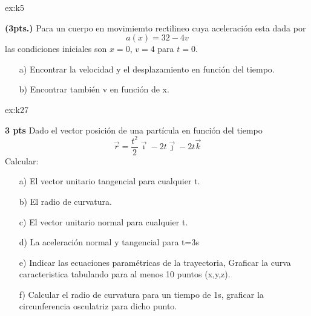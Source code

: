 \begin{multicols}{2}
    \begin{excercise}[][][a) $v(t) = \displaystyle{8-4e^{4-t}}$, $x(t)=\diplaystyle{8t+e^{-4t}}-1$; b) $x(v)=\displaystyle{-2\ln{(8-v)}-\frac{v}{4}+4\ln 2+1}$]{ex:k5}{
        \textbf{(3pts.)} 
        Para un cuerpo en movimiemto rectilineo cuya aceleración esta dada por 
         \begin{equation*}
             a(x)=32-4v
         \end{equation*}
         las condiciones iniciales son $x=0$,  $v=4$ para $t=0$.
         \begin{itemize}
             \item[a)] Encontrar la velocidad y el desplazamiento en función del tiempo.
             \item[b)] Encontrar también v en función de x.
         \end{itemize}
        }
    \end{excercise}
    \begin{excercise}[][][a) $\vec{e}_t=\frac{1}{\sqrt{t^2+8}}(t\vec{\imath}+2\vec{\jmath}-2\vec{k})$, b) $\rho=\sqrt{\frac{(t^2+8)^3}{8}}$, c) $\vec{e}_n=\frac{1}{\sqrt{8(t^2+8)}}(8\vec{\imath}-2t\vec{\jmath}+2t\vec{k})$, ]{ex:k27}{\textbf{3 pts}
         Dado el vector posición de una partícula en función del tiempo 
            \begin{equation*}
                \vec{r}=\frac{t^2}{2}\vec{\imath}-2t\vec{\jmath}-2t\vec{k}
            \end{equation*}
        Calcular:
            \begin{itemize}
                \item[a)] El vector unitario tangencial para cualquier t.
                \item[b)] El radio de curvatura.
                \item[c)] El vector unitario normal para cualquier t. 
                \item[d)] La aceleración normal y tangencial para t=3s
                \item[e)] Indicar las ecuaciones paramétricas de la trayectoria, Graficar la curva caracteristica tabulando para al menos 10 puntos (x,y,z).
                \item[f)] Calcular el radio de curvatura para un tiempo de 1s, graficar la circunferencia osculatriz para dicho punto.
             \end{itemize}
}
\end{excercise}
\end{multicols}
